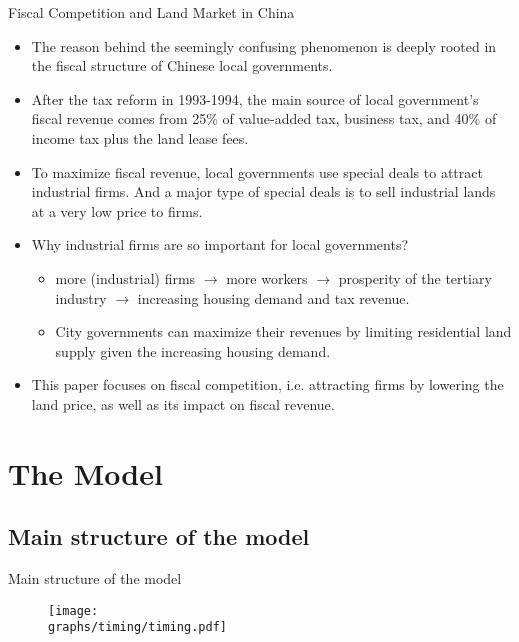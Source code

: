 \documentclass[xcolor={dvipsnames}]{beamer}
\theoremstyle{plain}
\newcommand{\graphs}{../../Graphs}
\begin{document}
\begin{frame}{Fiscal Competition and Land Market in China}
    \begin{itemize}
        \item The reason behind the seemingly confusing phenomenon is deeply rooted
              in the fiscal structure of Chinese local governments.
        \item After the tax reform in 1993-1994,
              the main source of local government's fiscal revenue comes from
              25\% of value-added tax, business tax,
              and 40\% of income tax plus the land lease fees.
        \item To maximize fiscal revenue, local governments use special deals to
              attract industrial firms.
              And a major type of special deals is to sell industrial lands
              at a very low price to firms.
        \item Why industrial firms are so important for local governments?
              \begin{itemize}
                  \item more (industrial) firms
                        $\rightarrow$ more workers
                        $\rightarrow$ prosperity of the tertiary industry
                        $\rightarrow$ increasing housing demand and tax revenue.
                  \item City governments can maximize their revenues
                        by limiting residential land supply given the increasing housing demand.
              \end{itemize}
        \item This paper focuses on fiscal competition,
              i.e. attracting firms by lowering the land price,
              as well as its impact on fiscal revenue.
    \end{itemize}
\end{frame}


\section{The Model}
\subsection{Main structure of the model}
\begin{frame}{Main structure of the model}
    \begin{figure}
        \centering
        \texttt{[image: \\graphs/timing/timing.pdf]}
        \label{fig3}
    \end{figure}
\end{frame}
\end{document}
